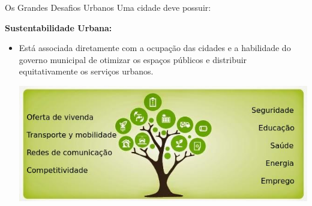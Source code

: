 \documentclass{beamer}
\begin{document}
\begin{frame}{Os Grandes Desafios Urbanos }
Uma cidade deve possuir:
\begin{block}{{\bf{Sustentabilidade Urbana:}}}
\begin{itemize}
 \item  Está associada diretamente com a ocupação das cidades e a habilidade do governo municipal de otimizar os espaços públicos
 e distribuir equitativamente os serviços urbanos. 
 \begin{center}
  \includegraphics[width=.8\textwidth]{img/sustentavel.jpg}
  
 \end{center}

\end{itemize}
\end{block}
        

\end{frame}
\end{document}
